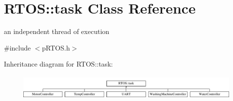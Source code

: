 \hypertarget{class_r_t_o_s_1_1task}{}\section{R\+T\+OS\+:\+:task Class Reference}
\label{class_r_t_o_s_1_1task}


an independent thread of execution  




{\ttfamily \#include $<$p\+R\+T\+O\+S.\+h$>$}

Inheritance diagram for R\+T\+OS\+:\+:task\+:\begin{figure}[H]
\begin{center}
\leavevmode
\includegraphics[height=1.294798cm]{class_r_t_o_s_1_1task}
\end{center}
\end{figure}

